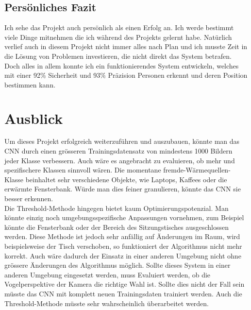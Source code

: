 \subsection{Persönliches Fazit}

Ich sehe das Projekt auch persönlich als einen Erfolg an. Ich werde bestimmt viele Dinge mitnehmen die ich während des Projekts gelernt habe. Natürlich verlief auch in diesem Projekt nicht immer alles nach Plan und ich musste Zeit in die Lösung von Problemen investieren, die nicht direkt das System betrafen. Doch alles in allem konnte ich ein funktionierendes System entwickeln, welches mit einer 92\% Sicherheit und 93\% Präzision Personen erkennt und deren Position bestimmen kann.

\section{Ausblick}
Um dieses Projekt erfolgreich weiterzuführen und auszubauen, könnte man das \gls{CNN} durch einen grösseren Trainingsdatensatz von mindestens 1000 Bildern jeder Klasse verbessern. Auch wäre es angebracht zu evaluieren, ob mehr und spezifischere Klassen sinnvoll wären. Die momentane fremde-Wärmequellen-Klasse beinhaltet sehr verschiedene Objekte, wie Laptops, Kaffees oder die erwärmte Fensterbank. Würde man dies feiner granulieren, könnte das \gls{CNN} sie besser erkennen.\\
Die Threshold-Methode hingegen bietet kaum Optimierungspotenzial. Man könnte einzig noch umgebungsspezifische Anpassungen vornehmen, zum Beispiel könnte die Fensterbank oder der Bereich des Sitzungstisches ausgeschlossen werden. Diese Methode ist jedoch sehr anfällig auf Änderungen im Raum, wird beispielsweise der Tisch verschoben, so funktioniert der Algorithmus nicht mehr korrekt. Auch wäre dadurch der Einsatz in einer anderen Umgebung nicht ohne grössere Änderungen des Algorithmus möglich. Sollte dieses System in einer anderen Umgebung eingesetzt werden, muss Evaluiert werden, ob die Vogelperspektive der Kamera die richtige Wahl ist. Sollte dies nicht der Fall sein müsste das CNN mit komplett neuen Trainingsdaten trainiert werden. Auch die Threshold-Methode müsste sehr wahrscheinlich überarbeitet werden.
